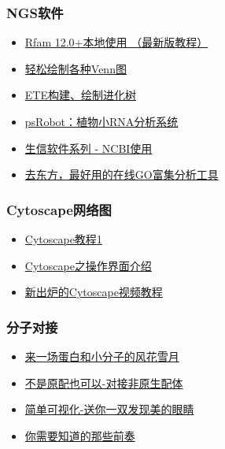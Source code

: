 \documentclass[]{article}
\providecommand{\tightlist}{%
  \setlength{\itemsep}{0pt}\setlength{\parskip}{0pt}}
\numberwithin{figure}{section}
\numberwithin{table}{section}
\begin{document}
\hypertarget{ngsux8f6fux4ef6}{%
\subsubsection{NGS软件}\label{ngsux8f6fux4ef6}}

\begin{itemize}
\tightlist
\item
  \href{http://mp.weixin.qq.com/s/5OIRHA22ZLr5Z8bEhDiBqg}{Rfam 12.0+本地使用 （最新版教程）}
\item
  \href{http://mp.weixin.qq.com/s/zn654JqG9OeO71rJUTDr2Q}{轻松绘制各种Venn图}
\item
  \href{http://mp.weixin.qq.com/s/DD1nZnx5mYxWGrohNgdPvQ}{ETE构建、绘制进化树}
\item
  \href{http://mp.weixin.qq.com/s/kWkEQOX-6SKMAUQmAuc86w}{psRobot：植物小RNA分析系统}
\item
  \href{http://mp.weixin.qq.com/s/4a5U8GdBoNFXkykL6m2EeA}{生信软件系列 - NCBI使用}
\item
  \href{https://mp.weixin.qq.com/s/l6j2encDfEQkt2UeNCMFhg}{去东方，最好用的在线GO富集分析工具}
\end{itemize}

\hypertarget{cytoscapeux7f51ux7edcux56fe}{%
\subsubsection{Cytoscape网络图}\label{cytoscapeux7f51ux7edcux56fe}}

\begin{itemize}
\tightlist
\item
  \href{http://mp.weixin.qq.com/s/m9uJm8GwSXb3xaRxtod08Q}{Cytoscape教程1}
\item
  \href{http://mp.weixin.qq.com/s/ZSoW7-qWs3BuSB7bkDnfmA}{Cytoscape之操作界面介绍}
\item
  \href{http://mp.weixin.qq.com/s/sKEy_Pn9qnWw4W-aXraA5g}{新出炉的Cytoscape视频教程}
\end{itemize}

\hypertarget{ux5206ux5b50ux5bf9ux63a5}{%
\subsubsection{分子对接}\label{ux5206ux5b50ux5bf9ux63a5}}

\begin{itemize}
\tightlist
\item
  \href{http://mp.weixin.qq.com/s/asAJDttAvsCLGd3PPU2agQ}{来一场蛋白和小分子的风花雪月}
\item
  \href{http://mp.weixin.qq.com/s/VDN1qAZGIMol6prwQW4umw}{不是原配也可以-对接非原生配体}
\item
  \href{http://mp.weixin.qq.com/s/P62sjqhSTxmWVicrEAk-RQ}{简单可视化-送你一双发现美的眼睛}
\item
  \href{http://mp.weixin.qq.com/s/5a5-6pXHfvyDc2Kfp4xDeQ}{你需要知道的那些前奏}
\end{itemize}
\end{document}
